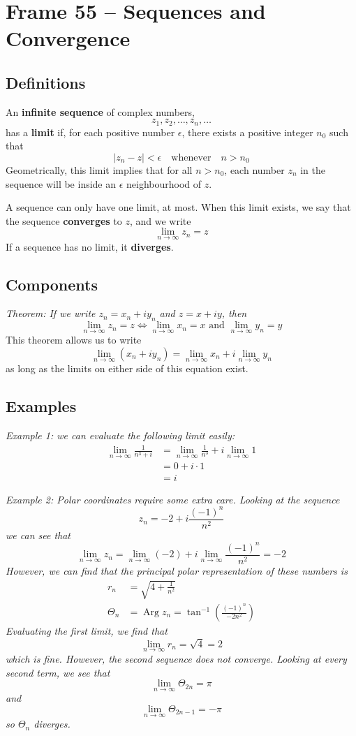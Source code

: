 \documentclass{article}
\renewcommand{\emph}{\textbf}
\DeclareMathOperator{\Arg}{Arg}
\begin{document}
\section{Frame 55 -- Sequences and Convergence}
\subsection{Definitions}
An \emph{infinite sequence} of complex numbers,
\[
	z_1, z_2, \dots, z_n, \dots
\]
has a \emph{limit} if, for each positive number $\epsilon$, there exists a positive integer $n_0$ such that
\[
	|z_n - z| < \epsilon	\quad \text{whenever} \quad	n > n_0
\]
Geometrically, this limit implies that for all $n > n_0$, each number $z_n$ in the sequence will be inside an $\epsilon$ neighbourhood of $z$.

A sequence can only have one limit, at most. When this limit exists, we say that the sequence \emph{converges} to $z$, and we write
\[
	\lim_{n \to \infty} z_n = z
\]
If a sequence has no limit, it \emph{diverges}.

\subsection{Components}
\textit{Theorem: If we write $z_n = x_n + iy_n$ and $z = x + iy$, then
\[
	\lim_{n \to \infty} z_n = z \iff
	\lim_{n \to \infty} x_n = x \text{ and }
	\lim_{n \to \infty} y_n = y
\]}
This theorem allows us to write
\[
	\lim_{n \to \infty} (x_n + iy_n)
	= \lim_{n \to \infty} x_n 
	+ i \lim_{n \to \infty} y_n
\]
as long as the limits on either side of this equation exist.

\subsection{Examples}
\textit{Example 1: we can evaluate the following limit easily:
\begin{align*}
	\lim_{n \to \infty} \frac{1}{n^3 + i}
	&= \lim_{n \to \infty} \frac{1}{n^3} + i\lim_{n \to \infty} 1 \\
	&= 0 + i\cdot1 \\
	&= i
\end{align*}
}

\textit{Example 2: Polar coordinates require some extra care. Looking at the sequence
\[
	z_n = -2 + i \frac{(-1)^n}{n^2}
\]
we can see that
\[
	\lim_{n \to \infty} z_n
	= \lim_{n \to \infty} (-2)
	+ i \lim_{n \to \infty} \frac{(-1)^n}{n^2}
	= -2
\]
However, we can find that the principal polar representation of these numbers is
\begin{align*}
	r_n &= \sqrt{4 + \frac{1}{n^2}} \\
	\Theta_n &= \Arg z_n = \tan^{-1} \left( \frac{(-1)^n}{-2n^2}\right)
\end{align*}
Evaluating the first limit, we find that
\[
	\lim_{n \to \infty} r_n = \sqrt{4} = 2
\]
which is fine. However, the second sequence does not converge. Looking at every second term, we see that
\[
	\lim_{n \to \infty} \Theta_{2n} = \pi
\]
and
\[
	\lim_{n \to \infty} \Theta_{2n - 1} = -\pi
\]
so $\Theta_n$ diverges.}
\end{document}
